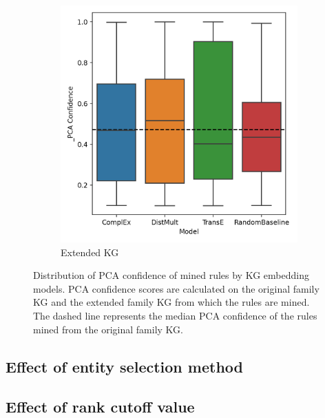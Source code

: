 \begin{figure}[h]
\begin{subfigure}{.5\textwidth}
  \includegraphics[width=1\linewidth]{figures/results/PCA_models/_PCA-models_family.png}
  \caption{Extended KG}
  \label{fig:_PCA_models_family_boxplot_sub}
\end{subfigure}
\caption{Distribution of PCA confidence of mined rules by KG embedding models. PCA confidence scores are calculated on the original family KG and the extended family KG from which the rules are mined. The dashed line represents the median PCA confidence of the rules mined from the original family KG.}
\label{fig:PCA_models_family_boxplot}
\end{figure}

\subsection{Effect of entity selection method}

\subsection{Effect of rank cutoff value}